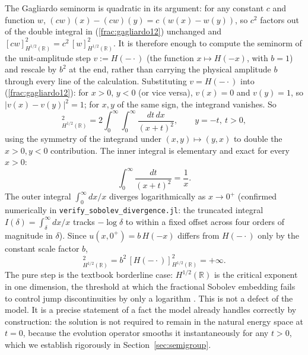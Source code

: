 \documentclass{article}
\begin{document}
The Gagliardo seminorm is quadratic in its argument: for any constant $c$
and function $w$, $(cw)(x)-(cw)(y) = c\,(w(x)-w(y))$, so $c^2$ factors out
of the double integral in (\ref{frac:gagliardo12}) unchanged and
$[cw]_{H^{1/2}(\mathbb{R})}^2 = c^2\,[w]_{H^{1/2}(\mathbb{R})}^2$. It is
therefore enough to compute the seminorm of the unit-amplitude step
$v:=H(-\cdot)$ (the function $x\mapsto H(-x)$, with $b=1$) and rescale by
$b^2$ at the end, rather than carrying the physical amplitude $b$ through
every line of the calculation. Substituting $v=H(-\cdot)$ into (\ref{frac:gagliardo12}):
for $x>0$, $y<0$ (or vice versa), $v(x)=0$ and $v(y)=1$, so
$|v(x)-v(y)|^2=1$; for $x,y$ of the same sign, the integrand vanishes. So
\begin{equation}
[H(-\cdot)]_{H^{1/2}(\mathbb{R})}^2
= 2\int_0^\infty\!\int_0^\infty \frac{dt\,dx}{(x+t)^2},
\qquad y=-t,\ t>0,
\label{frac:sgn_seminorm}
\end{equation}
using the symmetry of the integrand under $(x,y)\mapsto(y,x)$ to double the
$x>0,y<0$ contribution. The inner integral is elementary and exact for every
$x>0$:
\begin{equation}
\int_0^\infty \frac{dt}{(x+t)^2} = \frac{1}{x}.
\end{equation}
The outer integral $\int_0^\infty dx/x$ diverges logarithmically as
$x\to0^+$ (confirmed numerically in
\texttt{verify\_sobolev\_divergence.jl}: the truncated integral
$I(\delta)=\int_\delta^\infty dx/x$ tracks $-\log\delta$ to within a fixed
offset across four orders of magnitude in $\delta$). Since $u(x,0^+) =
b\,H(-x)$ differs from $H(-\cdot)$ only by the constant scale factor $b$,
\begin{equation}
[u(\cdot,0^+)]_{H^{1/2}(\mathbb{R})}^2 = b^2\,[H(-\cdot)]_{H^{1/2}(\mathbb{R})}^2 = +\infty.
\label{frac:sobolev-div}
\end{equation}
The pure step is the textbook borderline case: $H^{1/2}(\mathbb{R})$ is the
critical exponent in one dimension, the threshold at which the fractional
Sobolev embedding fails to control jump discontinuities by only a
logarithm \citep{dinezza2012hitchhikers}. This is not a defect of the model.
It is a precise statement of a fact the model already handles correctly by
construction: the solution is not required to remain in the natural energy
space at $t=0$, because the evolution operator smooths it instantaneously
for any $t>0$, which we establish rigorously in Section~\ref{sec:semigroup}.
\end{document}

